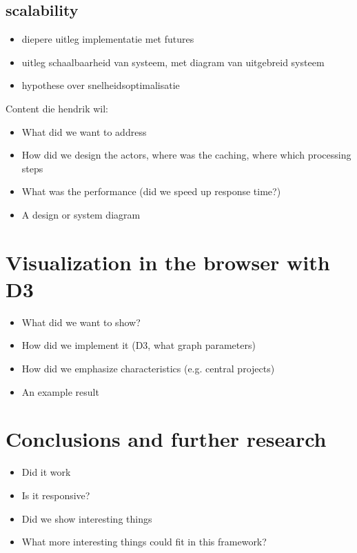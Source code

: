 \documentclass[10pt,a4paper]{article}
\begin{document}

\subsection{scalability}

\begin{itemize}
	\item diepere uitleg implementatie met futures
	\item uitleg schaalbaarheid van systeem, met diagram van uitgebreid systeem
	\item hypothese over snelheidsoptimalisatie
\end{itemize}


Content die hendrik wil:

\begin{itemize}
    \item What did we want to address
    \item How did we design the actors, where was the caching, where which processing steps
    \item What was the performance (did we speed up response time?)
    \item A design or system diagram
\end{itemize}

\section{Visualization in the browser with D3}\label{sec:visualization}

\begin{itemize}
    \item What did we want to show?
    \item How did we implement it (D3, what graph parameters)
    \item How did we emphasize characteristics (e.g. central projects)
    \item An example result
\end{itemize}

\section{Conclusions and further research}\label{sec:conclusions}

\begin{itemize}
    \item Did it work
    \item Is it responsive?
    \item Did we show interesting things
    \item What more interesting things could fit in this framework?
\end{itemize}
\end{document}
